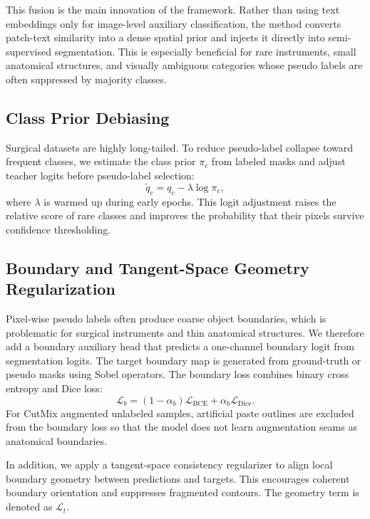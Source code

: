 \documentclass[journal,twoside]{IEEEtran}
\begin{document}
This fusion is the main innovation of the framework. Rather than using text embeddings only for image-level auxiliary classification, the method converts patch-text similarity into a dense spatial prior and injects it directly into semi-supervised segmentation. This is especially beneficial for rare instruments, small anatomical structures, and visually ambiguous categories whose pseudo labels are often suppressed by majority classes.

\subsection{Class Prior Debiasing}
Surgical datasets are highly long-tailed. To reduce pseudo-label collapse toward frequent classes, we estimate the class prior $\pi_c$ from labeled masks and adjust teacher logits before pseudo-label selection:
\begin{equation}
    \tilde{q}_c = q_c - \lambda \log \pi_c ,
\end{equation}
where $\lambda$ is warmed up during early epochs. This logit adjustment raises the relative score of rare classes and improves the probability that their pixels survive confidence thresholding.

\subsection{Boundary and Tangent-Space Geometry Regularization}
Pixel-wise pseudo labels often produce coarse object boundaries, which is problematic for surgical instruments and thin anatomical structures. We therefore add a boundary auxiliary head that predicts a one-channel boundary logit from segmentation logits. The target boundary map is generated from ground-truth or pseudo masks using Sobel operators. The boundary loss combines binary cross entropy and Dice loss:
\begin{equation}
    \mathcal{L}_{b} =
    (1-\alpha_b)\mathcal{L}_{\mathrm{BCE}}
    + \alpha_b \mathcal{L}_{\mathrm{Dice}}.
\end{equation}
For CutMix augmented unlabeled samples, artificial paste outlines are excluded from the boundary loss so that the model does not learn augmentation seams as anatomical boundaries.

In addition, we apply a tangent-space consistency regularizer to align local boundary geometry between predictions and targets. This encourages coherent boundary orientation and suppresses fragmented contours. The geometry term is denoted as $\mathcal{L}_{t}$.
\end{document}
